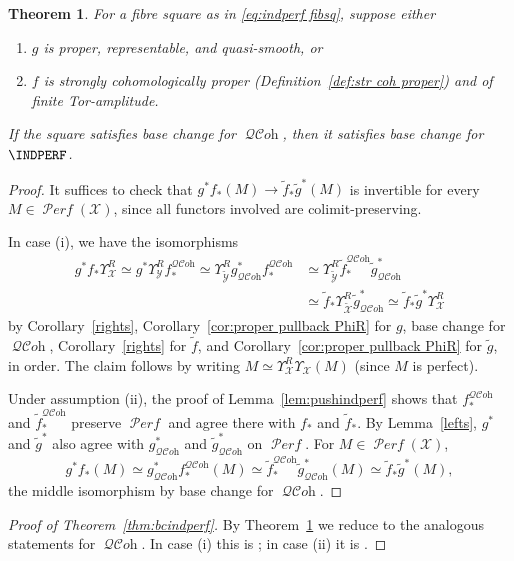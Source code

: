 \documentclass[12pt, oneside]{amsart}
\numberwithin{equation}{section}
\newtheorem{theorem}[subsubsection]{Theorem}
\theoremstyle{remark}
\theoremstyle{plain}
\DeclareMathOperator{\QCOH}{\mathcal{QC}\textit{oh}}
\DeclareMathOperator{\PERF}{\mathcal{P}\textit{erf}}
\newcommand{\YY}{\mathcal{Y}}
\newcommand{\XX}{\mathcal{X}}
\newcommand{\Ren}{\Upsilon}
\begin{document}
\begin{theorem}\label{AppMain} For a fibre square as in \eqref{eq:indperf fibsq}, suppose either
\begin{enumerate}
\item $g$ is proper, representable, and quasi-smooth, or
\item $f$ is strongly cohomologically proper (Definition~\ref{def:str coh proper}) and of finite Tor-amplitude.
\end{enumerate}
If the square satisfies base change for $\QCOH$, then it satisfies base change for $\INDPERF$.
\end{theorem}

\begin{proof}
It suffices to check that $g^*f_*(M) \to \tilde{f}_*\tilde{g}^*(M)$ is invertible for every $M \in \PERF(\XX)$, since all functors involved are colimit-preserving.

In case (i), we have the isomorphisms
\begin{align*}
  g^* f_* \Ren_\XX^R
  \simeq g^* \Ren_\YY^R f^{\QCOH}_*
  \simeq \Ren_{\tilde{\YY}}^R g^*_{\QCOH} f^{\QCOH}_*
  &\simeq \Ren_{\tilde{\YY}}^R \tilde{f}^{\QCOH}_* \tilde{g}^*_{\QCOH}\\
  &\simeq \tilde{f}_* \Ren_{\tilde{\XX}}^R \tilde{g}^*_{\QCOH}
  \simeq \tilde{f}_* \tilde{g}^* \Ren_\XX^R
\end{align*}
by Corollary~\ref{rights}, Corollary~\ref{cor:proper pullback PhiR} for $g$, base change for $\QCOH$, Corollary~\ref{rights} for $\tilde{f}$, and Corollary~\ref{cor:proper pullback PhiR} for $\tilde{g}$, in order.
The claim follows by writing $M \simeq \Ren_\XX^R \Ren_\XX(M)$ (since $M$ is perfect).

Under assumption (ii), the proof of Lemma~\ref{lem:pushindperf} shows that $f^{\QCOH}_*$ and $\tilde{f}^{\QCOH}_*$ preserve $\PERF$ and agree there with $f_*$ and $\tilde{f}_*$. By Lemma~\ref{lefts}, $g^*$ and $\tilde{g}^*$ also agree with $g^*_{\QCOH}$ and $\tilde{g}^*_{\QCOH}$ on $\PERF$. For $M \in \PERF(\XX)$,
\[
g^* f_*(M) \simeq g^*_{\QCOH} f^{\QCOH}_*(M) \simeq \tilde{f}^{\QCOH}_* \tilde{g}^*_{\QCOH}(M) \simeq \tilde{f}_* \tilde{g}^*(M),
\]
the middle isomorphism by base change for $\QCOH$.
\end{proof}

\begin{proof}[Proof of Theorem~\ref{thm:bcindperf}] By Theorem~\ref{AppMain} we reduce to the analogous statements for $\QCOH$. In case (i) this is \cite[Prop.~6.3.4.1(b)]{SAG}; in case (ii) it is \cite[Prop.~A.1.5]{HLP}. \end{proof}
\end{document}
